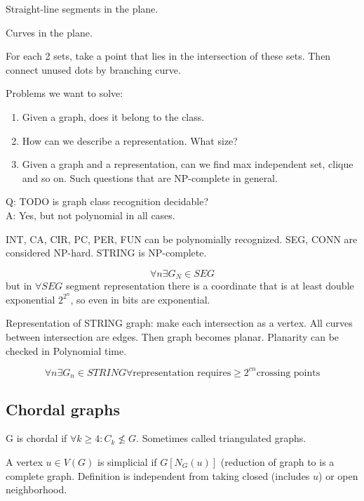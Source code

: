 \begin{definition}
	Straight-line segments in the plane.
\end{definition}

\begin{definition}
	Curves in the plane.
\end{definition}

For each 2 sets, take a point that lies in the intersection of these sets.
Then connect unused dots by branching curve.

Problems we want to solve:
\begin{enumerate}
	\item Given a graph, does it belong to the class.
	\item How can we describe a representation. What size?
	\item Given a graph and a representation, can we find max independent set, clique and so on.
	Such questions that are NP-complete in general.
\end{enumerate}

Q: TODO is graph class recognition decidable?\\
A: Yes, but not polynomial in all cases.

INT, CA, CIR, PC, PER, FUN can be polynomially recognized.
SEG, CONN are considered NP-hard.
STRING is NP-complete.

\[ \forall n \exists G_N \in SEG\]
but in $\forall SEG$ segment representation there is a coordinate that is at least double exponential $2^{2^n}$, so even in bits are exponential.

Representation of STRING graph: make each intersection as a vertex.
All curves between intersection are edges.
Then graph becomes planar.
Planarity can be checked in Polynomial time.

\[ \forall n \exists G_n \in STRING \forall \text{representation requires} \geq 2^{cn} \text{crossing points} \]

\subsection{Chordal graphs}

\begin{definition}
	G is chordal if $\forall k \geq 4: C_k \not\leq G$.
	Sometimes called triangulated graphs.
\end{definition}

\begin{definition}[Simplicial]
	A vertex $u \in V(G)$ is simplicial  if $G[N_G(u)]$ (reduction of graph to  is a complete graph.
	Definition is independent from taking closed (includes $u$) or open neighborhood.
\end{definition}

